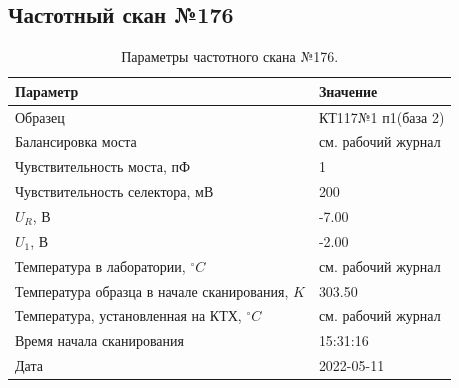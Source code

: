 \subsection{Частотный скан №176}
\begin{table}[!ht]
    \centering
    \caption{Параметры частотного скана №176.}
    \begin{tabular}{|l|l|}
        \hline
        Параметр                                       & Значение                  \\ \hline
        Образец                                        & КТ117№1 п1(база 2)        \\ \hline
        Балансировка моста                             & см. рабочий журнал        \\ \hline
        Чувствительность моста, пФ                     & 1                         \\ \hline
        Чувствительность селектора, мВ                 & 200                       \\ \hline
        $U_R$, В                                       & -7.00                     \\ \hline
        $U_1$, В                                       & -2.00                     \\ \hline
        Температура в лаборатории, $^\circ C$          & см. рабочий журнал        \\ \hline
        Температура образца в начале сканирования, $K$ & 303.50                    \\ \hline
        Температура, установленная на КТХ, $^\circ C$  & см. рабочий журнал        \\ \hline
        Время начала сканирования                      & 15:31:16                  \\ \hline
        Дата                                           & 2022-05-11                \\ \hline
    \end{tabular}
    \label{table:frequency_scan_176}
\end{table}

